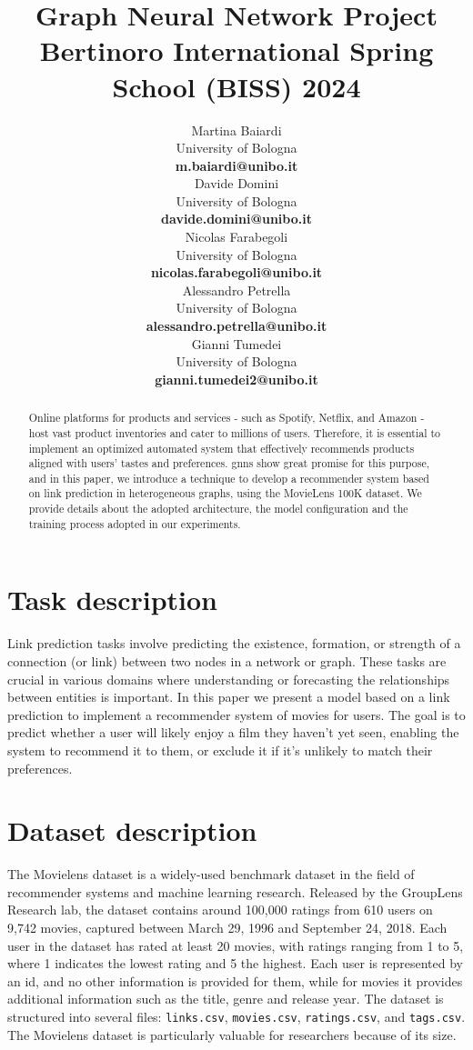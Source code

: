 \documentclass[11pt]{article}
\title{Graph Neural Network Project \\
Bertinoro International Spring School (BISS) 2024}
\author{
  Martina Baiardi \\
  University of Bologna \\
  {\bf m.baiardi@unibo.it} \\ \And
  Davide Domini \\
  University of Bologna \\
  {\bf davide.domini@unibo.it} \\  \And
  Nicolas Farabegoli \\
  University of Bologna \\
  {\bf nicolas.farabegoli@unibo.it} \\  \AND
  Alessandro Petrella\\
  University of Bologna \\
  {\bf alessandro.petrella@unibo.it} \\ \And
  Gianni Tumedei \\
  University of Bologna \\
  {\bf gianni.tumedei2@unibo.it}
}
\begin{document}
\maketitle

\begin{abstract}

Online platforms for products and services - such as Spotify, Netflix, and Amazon - 
host vast product inventories and cater to millions of users. 
Therefore, it is essential to implement an optimized automated system that effectively 
recommends products aligned with users' tastes and preferences.  
%
\acp{gnn} show great promise for this purpose, and in this paper, 
we introduce a technique to develop a recommender system based on 
link prediction in heterogeneous graphs, using the MovieLens 100K dataset.
%
We provide details about the adopted architecture, the model configuration and the training
process adopted in our experiments.


\end{abstract}

\section{Task description}\label{sec:task-description}
Link prediction tasks involve predicting the existence, formation, 
or strength of a connection (or link) between two nodes in a network or graph. 
These tasks are crucial in various domains where understanding or forecasting the relationships 
between entities is important. 
In this paper we present a model based on a link prediction to implement a recommender system of movies for users.
The goal is to predict whether a user will likely enjoy a film they haven't yet seen, 
enabling the system to recommend it to them, or exclude it if it's unlikely to match their preferences.


\section{Dataset description}\label{sec:dataset-description}
The Movielens dataset \cite{harper2015movielens} is a widely-used benchmark dataset in the field of recommender systems and machine learning research. 
Released by the GroupLens Research lab, the dataset contains around 100,000 ratings from 610 users on 9,742 movies, 
captured between March 29, 1996 and September 24, 2018. 
Each user in the dataset has rated at least 20 movies, with ratings ranging from 1 to 5, where 1 indicates the lowest rating and 5 the highest.
Each user is represented by an id, and no other information is provided for them, while for movies it provides additional information such as the title, genre and release year.
The dataset is structured into several files: \texttt{links.csv}, \texttt{movies.csv}, \texttt{ratings.csv}, and \texttt{tags.csv}.
The Movielens dataset is particularly valuable for researchers because of its size.
\end{document}
